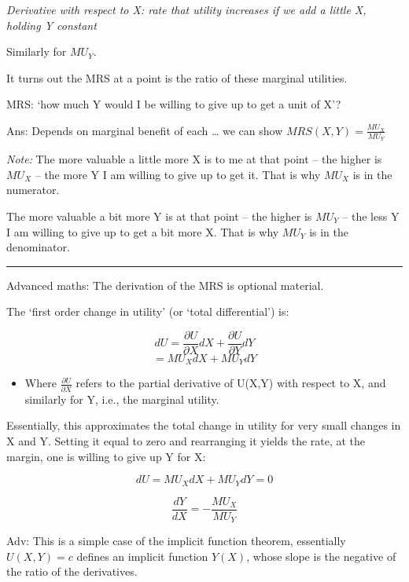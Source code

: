 \documentclass[]{article}
\providecommand{\tightlist}{%
  \setlength{\itemsep}{0pt}\setlength{\parskip}{0pt}}
\begin{document}
\emph{Derivative with respect to X: rate that utility increases if we
add a little X, holding Y constant}

Similarly for \(MU_Y\).

\bigskip

It turns out the MRS at a point is the ratio of these marginal
utilities.

MRS: `how much Y would I be willing to give up to get a unit of X'?

\bigskip

Ans: Depends on marginal benefit of each \ldots{} we can show
\(MRS(X,Y)=\frac{MU_{X}}{MU_{Y}}\)

\emph{Note:} The more valuable a little more X is to me at that point --
the higher is \(MU_X\) -- the more Y I am willing to give up to get it.
That is why \(MU_X\) is in the numerator.

The more valuable a bit more Y is at that point -- the higher is
\(MU_Y\) -- the less Y I am willing to give up to get a bit more X. That
is why \(MU_Y\) is in the denominator.

\begin{center}\rule{0.5\linewidth}{\linethickness}\end{center}

\textcolor{RawSienna}{Advanced maths: The derivation of the MRS is optional material.}

The `first order change in utility' (or `total differential') is:

\[ dU  = \frac{\partial U}{\partial X}dX + \frac{\partial U}{\partial Y}dY\]
\[ = MU_{X}dX + MU_{Y}dY\]

\begin{itemize}
\tightlist
\item
  Where \(\frac{\partial U}{\partial X}\) refers to the partial
  derivative of U(X,Y) with respect to X, and similarly for Y, i.e., the
  marginal utility.
\end{itemize}

Essentially, this approximates the total change in utility for very
small changes in X and Y. Setting it equal to zero and rearranging it
yields the rate, at the margin, one is willing to give up Y for X:

\[dU  = MU_{X}dX + MU_{Y}dY = 0 \]

\[\frac{dY}{dX}=-\frac{MU_{X}}{MU_{Y}}\]

\textcolor{RawSienna}{Adv: This is a simple case of the implicit function theorem, essentially $U(X,Y)=c$ defines an implicit function $Y(X)$, whose slope is the negative of the ratio of the derivatives.}
\end{document}
